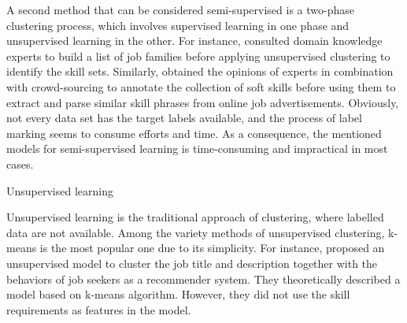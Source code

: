 \documentclass[a4paper,man,floatsintext,natbib,noextraspace]{apa6}
\makeatletter
\renewcommand{\subsubsection}{\@startsection{subsubsection}{3}
  {\z@}
  {\b@level@two@skip}
  {\e@level@two@skip}
  {\normalfont\normalsize\bfseries\itshape}}
\makeatother
\begin{document}
A second method that can be considered semi-supervised is a two-phase clustering process, which involves supervised learning in one phase and unsupervised learning in the other. For instance, \cite{demauroHumanResourcesBig2018} consulted domain knowledge experts to build a list of job families before applying unsupervised clustering to identify the skill sets. Similarly, \cite{calancaResponsibleTeamPlayers2019} obtained the opinions of experts in combination with crowd-sourcing to annotate the collection of soft skills before using them to extract and parse similar skill phrases from online job advertisements. Obviously, not every data set has the target labels available, and the process of label marking seems to consume efforts and time. As a consequence, the mentioned models for semi-supervised learning is time-consuming and impractical in most cases.

\subsubsection{Unsupervised learning}

Unsupervised learning is the traditional approach of clustering, where labelled data are not available. Among the variety methods of unsupervised clustering, k-means is the most popular one due to its simplicity. For instance, \cite{mhamdiJobRecommendationBased2020} proposed an unsupervised model to cluster the job title and description together with the behaviors of job seekers as a recommender system. They theoretically described a model based on k-means algorithm. However, they did not use the skill requirements as features in the model.
\end{document}
